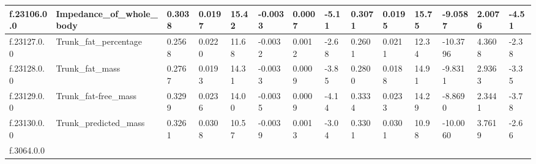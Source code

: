 \begin{longtable}{llllllllllllll}
\multicolumn{1}{|l|}{f.23106.0.0} &
  \multicolumn{1}{l|}{Impedance\_of\_whole\_body} &
  \multicolumn{1}{l|}{0.3038} &
  \multicolumn{1}{l|}{0.0197} &
  \multicolumn{1}{l|}{15.42} &
  \multicolumn{1}{l|}{-0.0033} &
  \multicolumn{1}{l|}{0.0007} &
  \multicolumn{1}{l|}{-5.11} &
  \multicolumn{1}{l|}{0.3071} &
  \multicolumn{1}{l|}{0.0195} &
  \multicolumn{1}{l|}{15.75} &
  \multicolumn{1}{l|}{-9.0587} &
  \multicolumn{1}{l|}{2.0076} &
  \multicolumn{1}{l|}{-4.51} \\ \hline
\multicolumn{1}{|l|}{f.23127.0.0} &
  \multicolumn{1}{l|}{Trunk\_fat\_percentage} &
  \multicolumn{1}{l|}{0.2568} &
  \multicolumn{1}{l|}{0.0220} &
  \multicolumn{1}{l|}{11.68} &
  \multicolumn{1}{l|}{-0.0032} &
  \multicolumn{1}{l|}{0.0012} &
  \multicolumn{1}{l|}{-2.68} &
  \multicolumn{1}{l|}{0.2601} &
  \multicolumn{1}{l|}{0.0211} &
  \multicolumn{1}{l|}{12.34} &
  \multicolumn{1}{l|}{-10.3796} &
  \multicolumn{1}{l|}{4.3608} &
  \multicolumn{1}{l|}{-2.38} \\ \hline
\multicolumn{1}{|l|}{f.23128.0.0} &
  \multicolumn{1}{l|}{Trunk\_fat\_mass} &
  \multicolumn{1}{l|}{0.2767} &
  \multicolumn{1}{l|}{0.0193} &
  \multicolumn{1}{l|}{14.31} &
  \multicolumn{1}{l|}{-0.0033} &
  \multicolumn{1}{l|}{0.0009} &
  \multicolumn{1}{l|}{-3.85} &
  \multicolumn{1}{l|}{0.2800} &
  \multicolumn{1}{l|}{0.0188} &
  \multicolumn{1}{l|}{14.91} &
  \multicolumn{1}{l|}{-9.8311} &
  \multicolumn{1}{l|}{2.9363} &
  \multicolumn{1}{l|}{-3.35} \\ \hline
\multicolumn{1}{|l|}{f.23129.0.0} &
  \multicolumn{1}{l|}{Trunk\_fat-free\_mass} &
  \multicolumn{1}{l|}{0.3299} &
  \multicolumn{1}{l|}{0.0236} &
  \multicolumn{1}{l|}{14.00} &
  \multicolumn{1}{l|}{-0.0035} &
  \multicolumn{1}{l|}{0.0009} &
  \multicolumn{1}{l|}{-4.14} &
  \multicolumn{1}{l|}{0.3334} &
  \multicolumn{1}{l|}{0.0233} &
  \multicolumn{1}{l|}{14.29} &
  \multicolumn{1}{l|}{-8.8690} &
  \multicolumn{1}{l|}{2.3441} &
  \multicolumn{1}{l|}{-3.78} \\ \hline
\multicolumn{1}{|l|}{f.23130.0.0} &
  \multicolumn{1}{l|}{Trunk\_predicted\_mass} &
  \multicolumn{1}{l|}{0.3261} &
  \multicolumn{1}{l|}{0.0308} &
  \multicolumn{1}{l|}{10.57} &
  \multicolumn{1}{l|}{-0.0039} &
  \multicolumn{1}{l|}{0.0013} &
  \multicolumn{1}{l|}{-3.04} &
  \multicolumn{1}{l|}{0.3301} &
  \multicolumn{1}{l|}{0.0301} &
  \multicolumn{1}{l|}{10.98} &
  \multicolumn{1}{l|}{-10.0060} &
  \multicolumn{1}{l|}{3.7619} &
  \multicolumn{1}{l|}{-2.66} \\ \hline
\multicolumn{1}{|l|}{f.3064.0.0} &

\end{longtable}
